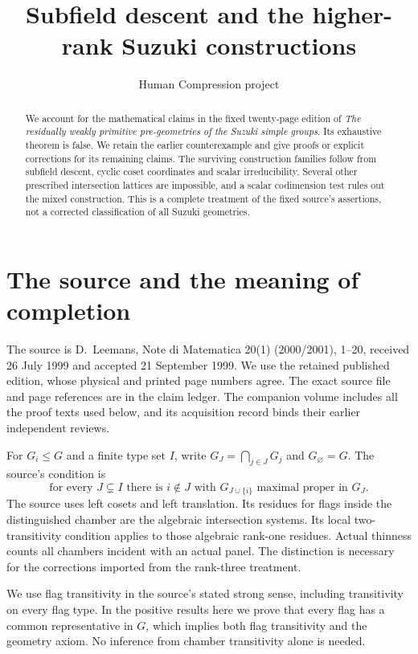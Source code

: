 \documentclass[11pt,a4paper]{article}
\title{Subfield descent and the higher-rank Suzuki constructions}
\author{Human Compression project}\date{}
\begin{document}
\maketitle
\begin{abstract}
We account for the mathematical claims in the fixed twenty-page edition
of \emph{The residually weakly primitive pre-geometries of the Suzuki
simple groups}. Its exhaustive theorem is false. We retain the earlier
counterexample and give proofs or explicit corrections for its remaining
claims. The surviving construction families follow from subfield descent,
cyclic coset coordinates and scalar irreducibility. Several other prescribed
intersection lattices are impossible, and a scalar codimension test rules
out the mixed construction. This is a complete treatment of the fixed
source's assertions, not a corrected classification of all Suzuki geometries.
\end{abstract}

\section{The source and the meaning of completion}
The source is D.~Leemans, Note di Matematica 20(1) (2000/2001),
1--20, received 26 July 1999 and accepted 21 September 1999.
We use the retained published edition, whose physical and printed page
numbers agree. The exact source file and page references are in the
claim ledger. The companion volume includes all the proof texts used
below, and its acquisition record binds their earlier independent reviews.

For $G_i\le G$ and a finite type set $I$, write
$G_J=\bigcap_{j\in J}G_j$ and $G_\varnothing=G$.
The source's condition is
\[
 \text{for every }J\subsetneq I\text{ there is }i\notin J
 \text{ with }G_{J\cup\{i\}}\text{ maximal proper in }G_J.
 \tag{1}
\]
The source uses left cosets and left translation. Its residues for flags
inside the distinguished chamber are the algebraic intersection systems.
Its local two-transitivity condition applies to those algebraic rank-one
residues. Actual thinness counts all chambers incident with an actual panel.
The distinction is necessary for the corrections imported from the
rank-three treatment.

We use flag transitivity in the source's stated strong sense, including
transitivity on every flag type. In the positive results here we prove
that every flag has a common representative in $G$, which implies both
flag transitivity and the geometry axiom. No inference from chamber
transitivity alone is needed.
\end{document}
